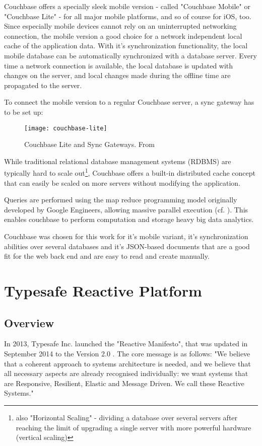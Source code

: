 Couchbase offers a specially sleek mobile version - called "Couchbase Mobile" or "Couchbase Lite" - for all major mobile platforms, and so of course for iOS, too. Since especially mobile devices cannot rely on an uninterrupted networking connection, the mobile version a good choice for a network independent local cache of the application data. With it's synchronization functionality, the local mobile database can be automatically synchronized with a database server. Every time a network connection is available, the local database is updated with changes on the server, and local changes made during the offline time are propagated to the server.

To connect the mobile version to a regular Couchbase server, a sync gateway has to be set up:

\begin{figure}[H]
\centering
\texttt{[image: couchbase-lite]}
\caption{Couchbase Lite and Sync Gateways. From \cite{couchbase-lite}}
\end{figure}

While traditional relational database management systems (RDBMS) are typically hard to scale out\footnote{also "Horizontal Scaling" - dividing a database over several servers after reaching the limit of upgrading a single server with more powerful hardware (vertical scaling)}, Couchbase offers a built-in distributed cache concept that can easily be scaled on more servers without modifying the application.

Queries are performed using the map reduce programming model originally developed by Google Engineers, allowing massive parallel execution (cf. \cite{MapReduceArticle}). This enables couchbase to perform computation and storage heavy big data analytics.

Couchbase was chosen for this work for it's mobile variant, it's synchronization abilities over several databases and it's JSON-based documents that are a good fit for the web back end and are easy to read and create manually.


\section{Typesafe Reactive Platform}

\subsection{Overview}

In 2013, Typesafe Inc. launched the "Reactive Manifesto", that was updated in September 2014 to the Version 2.0 \cite{reactivemanifesto}. The core message is as follows: "We believe that a coherent approach to systems architecture is needed, and we believe that all necessary aspects are already recognised individually: we want systems that are Responsive, Resilient, Elastic and Message Driven. We call these Reactive Systems."


